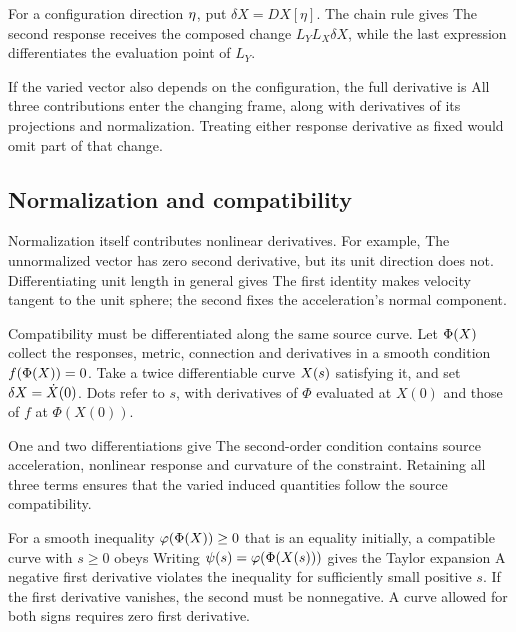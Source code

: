 For a configuration direction $\eta$, put $\delta X=DX[\eta]$. The chain rule gives
\CouplingMapFullChainRuleDisplay
The second response receives the composed change $L_YL_X\delta X$, while the last expression differentiates the evaluation point of $L_Y$.

If the varied vector also depends on the configuration, the full derivative is
\CouplingMapBothDifferentialVariationsDisplay
All three contributions enter the changing frame, along with derivatives of its projections and normalization. Treating either response derivative as fixed would omit part of that change.

\subsection{Normalization and compatibility}
Normalization itself contributes nonlinear derivatives. For example,
\DifferentiationNormalizationDisplay
The unnormalized vector has zero second derivative, but its unit direction does not. Differentiating unit length in general gives
\DifferentiationUnitConstraintDisplay
The first identity makes velocity tangent to the unit sphere; the second fixes the acceleration's normal component.

Compatibility must be differentiated along the same source curve. Let $\Phi(X)$ collect the responses, metric, connection and derivatives in a smooth condition $f(\Phi(X))=0$. Take a twice differentiable curve $X(s)$ satisfying it, and set $\delta X=\dot X(0)$. Dots refer to $s$, with derivatives of $\Phi$ evaluated at $X(0)$ and those of $f$ at $\Phi(X(0))$.

One and two differentiations give
\CouplingMapPropagatedCompatibilityDisplay
The second-order condition contains source acceleration, nonlinear response and curvature of the constraint. Retaining all three terms ensures that the varied induced quantities follow the source compatibility.

For a smooth inequality $\varphi(\Phi(X))\ge0$ that is an equality initially, a compatible curve with $s\ge0$ obeys
\CouplingMapContactDerivativeDisplay
Writing $\psi(s)=\varphi(\Phi(X(s)))$ gives the Taylor expansion
\DifferentiationContactTaylorDisplay
A negative first derivative violates the inequality for sufficiently small positive $s$. If the first derivative vanishes, the second must be nonnegative. A curve allowed for both signs requires zero first derivative.

